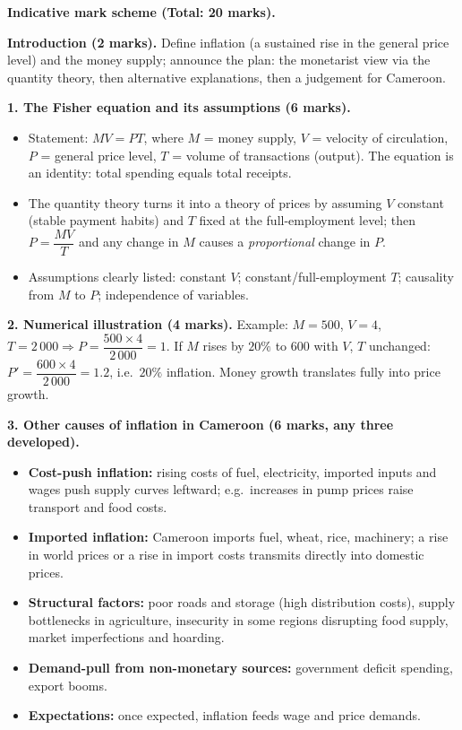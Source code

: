 \documentclass[11pt]{article}
\begin{document}
\begin{corrige}
\textbf{Indicative mark scheme (Total: 20 marks).}

\textbf{Introduction (2 marks).} Define inflation (a sustained rise in the general price level) and the money supply; announce the plan: the monetarist view via the quantity theory, then alternative explanations, then a judgement for Cameroon.

\textbf{1. The Fisher equation and its assumptions (6 marks).}
\begin{itemize}
\item Statement: $MV = PT$, where $M$ = money supply, $V$ = velocity of circulation, $P$ = general price level, $T$ = volume of transactions (output). The equation is an identity: total spending equals total receipts.
\item The quantity theory turns it into a theory of prices by assuming $V$ constant (stable payment habits) and $T$ fixed at the full-employment level; then $P = \dfrac{MV}{T}$ and any change in $M$ causes a \emph{proportional} change in $P$.
\item Assumptions clearly listed: constant $V$; constant/full-employment $T$; causality from $M$ to $P$; independence of variables.
\end{itemize}

\textbf{2. Numerical illustration (4 marks).} Example: $M = 500$, $V = 4$, $T = 2\,000 \Rightarrow P = \dfrac{500 \times 4}{2\,000} = 1$. If $M$ rises by $20\%$ to $600$ with $V$, $T$ unchanged: $P' = \dfrac{600 \times 4}{2\,000} = 1.2$, i.e.\ $20\%$ inflation. Money growth translates fully into price growth.

\textbf{3. Other causes of inflation in Cameroon (6 marks, any three developed).}
\begin{itemize}
\item \textbf{Cost-push inflation:} rising costs of fuel, electricity, imported inputs and wages push supply curves leftward; e.g.\ increases in pump prices raise transport and food costs.
\item \textbf{Imported inflation:} Cameroon imports fuel, wheat, rice, machinery; a rise in world prices or a rise in import costs transmits directly into domestic prices.
\item \textbf{Structural factors:} poor roads and storage (high distribution costs), supply bottlenecks in agriculture, insecurity in some regions disrupting food supply, market imperfections and hoarding.
\item \textbf{Demand-pull from non-monetary sources:} government deficit spending, export booms.
\item \textbf{Expectations:} once expected, inflation feeds wage and price demands.
\end{itemize}


\end{corrige}
\end{document}
